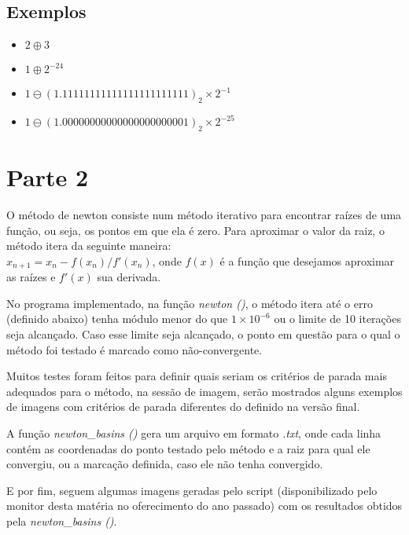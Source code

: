 \documentclass{article}
\begin{document}
\subsection*{Exemplos}
\begin{itemize}
  \item $2 \oplus 3$
  \item $1 \oplus 2^{-24} $ 
  \item $1 \ominus {(1.11111111111111111111111)}_{2} \times 2^{-1}$
  \item $1 \ominus {(1.00000000000000000000001)}_{2} \times 2^{-25}$
\end{itemize}

\begin{flushleft}

\end{flushleft}

\section*{Parte 2}
O método de newton consiste num método iterativo para encontrar raízes de uma função, ou seja,
os pontos em que ela é zero. Para aproximar o valor da raiz, o método itera da seguinte maneira: \\
$x_{n+1} = x_{n} - f(x_{n})/f'(x_{n})$, onde $f(x)$ é a função que desejamos aproximar as
raízes e $f'(x)$ sua derivada.

No programa implementado, na função \textit{newton ()}, o método itera até o erro (definido abaixo) 
tenha módulo menor do que $1 \times 10^{-6}$ ou o limite de 10 iterações seja alcançado. Caso esse limite seja alcançado,
o ponto em questão para o qual o método foi testado é marcado como não-convergente.

Muitos testes foram feitos para definir quais seriam os critérios de parada mais adequados para o método,
na sessão de imagem, serão mostrados alguns exemplos de imagens com critérios de parada diferentes do definido na versão final. 

A função \textit{newton\_basins ()} gera um arquivo em formato \textit{.txt}, onde cada linha contém as coordenadas 
do ponto testado pelo método e a raiz para qual ele convergiu, ou a marcação definida, caso ele não tenha
convergido.


E por fim, seguem algumas imagens geradas pelo script (disponibilizado pelo
monitor desta matéria no oferecimento do ano passado) com os resultados obtidos
pela \textit{newton\_basins ()}.


\end{document}
